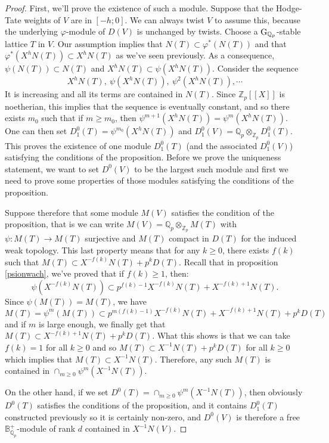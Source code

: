 \documentclass[11pt]{amsart}
\def\Z{{\mathbb Z}_p}
\def\Q{{\mathbb Q}_p}
\def\g{{\rm G}_{\Q}}
\def\ra{\rightarrow}
\def\bplus{\mathbb{B}^+}
\begin{document}
\begin{proof} 
First, we'll prove the existence of such a module. 
Suppose that the Hodge-Tate weights of $V$ are in $[-h;0]$. We can 
always twist $V$ to assume this, because the underlying $\varphi$-module 
of $D(V)$ is unchanged by twists. Choose a $\g$-stable lattice $T$ in $V$. 
Our assumption implies that $N(T) \subset \varphi^*(N(T))$ and that 
$\varphi^*(X^h N(T)) \subset X^h N(T)$ as we've seen previously.  
As a consequence, $\psi(N(T)) \subset N(T)$ and $X^h N(T) \subset 
\psi(X^h N(T))$. Consider the sequence  \[ X^h N(T),\ \psi(X^h N(T)), 
\ \psi^2(X^h N(T)),\cdots \] 
It is increasing and all its terms are  
contained in $N(T)$. Since $\Z[[X]]$ is 
noetherian, this implies that the sequence is eventually constant, and 
so there exists $m_0$ such that if $m \geq m_0$, then $\psi^{m+1}(X^h 
N(T)) = \psi^m(X^h N(T))$. One can then set $D^0_1(T)=\psi^{m_0}(X^h 
N(T))$ and $D^0_1(V) = \Q \otimes_{\Z} 
D^0_1(T)$. 
This proves the existence of one module  
$D^0_1(T)$ (and the associated $D^0_1(V)$) satisfying the 
conditions of the proposition. Before we prove the  
uniqueness statement, 
we want to set $D^0(V)$ to be the largest such module and first we 
need to prove some properties of those modules satisfying the 
conditions of the proposition. 
 
Suppose therefore that some module  
$M(V)$ satisfies the condition of the proposition, that is we can 
write $M(V) = \Q \otimes_{\Z} M(T)$ with $\psi : M(T) \ra M(T)$ 
surjective and $M(T)$ compact in $D(T)$ for the induced weak 
topology. This last property means that for any $k \geq 0$, there 
exists $f(k)$ such that $M(T) \subset X^{-f(k)}N(T) + p^k 
D(T)$. Recall that in proposition \ref{psionwach}, we've proved that 
if $f(k) \geq 1$, then: 
\[ \psi(X^{-f(k)}N(T)) \subset p^{f(k)-1} X^{-f(k)}N(T) + 
X^{-f(k)+1}N(T). \] 
Since $\psi(M(T))=M(T)$, we have \[ M(T)=\psi^m(M(T)) \subset 
p^{m(f(k)-1)} X^{-f(k)}N(T) + X^{-f(k)+1}N(T) + p^k 
D(T) \] and if $m$ is large enough, we finally get that  
$M(T) \subset X^{-f(k)+1}N(T) + p^k D(T)$. What this shows is that we 
can take $f(k)=1$ for all $k \geq 0$ and so $M(T) \subset 
X^{-1} N(T) + p^k D(T)$ for all $k \geq 0$ which implies that $M(T) 
\subset X^{-1} N(T)$. Therefore, any such $M(T)$ is contained in 
$\cap_{m \geq 0} \psi^m(X^{-1}N(T))$.  
 
On the other hand, if we set $D^0(T) = \cap_{m \geq 0} 
\psi^m(X^{-1}N(T))$, then obviously $D^0(T)$ satisfies the conditions 
of the proposition, and it contains $D^0_1(T)$ constructed previously 
so it is certainly non-zero, and $D^0(V)$ is therefore a free 
$\bplus_{\Q}$-module of rank $d$ contained in $X^{-1}N(V)$.   
 

\end{proof}
\end{document}
